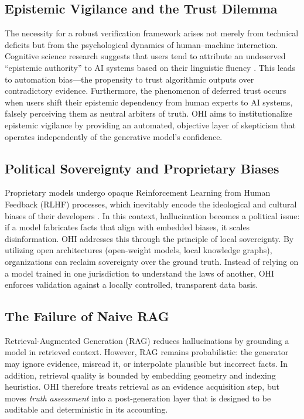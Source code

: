 \documentclass[10pt,a4paper,twocolumn]{article}
\begin{document}
\subsection{Epistemic Vigilance and the Trust Dilemma}
The necessity for a robust verification framework arises not merely from technical deficits but from the psychological dynamics of human--machine interaction. Cognitive science research suggests that users tend to attribute an undeserved \enquote{epistemic authority} to AI systems based on their linguistic fluency \cite{jaeger2024}. This leads to automation bias---the propensity to trust algorithmic outputs over contradictory evidence. Furthermore, the phenomenon of deferred trust occurs when users shift their epistemic dependency from human experts to AI systems, falsely perceiving them as neutral arbiters of truth. OHI aims to institutionalize epistemic vigilance by providing an automated, objective layer of skepticism that operates independently of the generative model's confidence.

\subsection{Political Sovereignty and Proprietary Biases}
Proprietary models undergo opaque Reinforcement Learning from Human Feedback (RLHF) processes, which inevitably encode the ideological and cultural biases of their developers \cite{motoki2024}. In this context, hallucination becomes a political issue: if a model fabricates facts that align with embedded biases, it scales disinformation. OHI addresses this through the principle of local sovereignty. By utilizing open architectures (open-weight models, local knowledge graphs), organizations can reclaim sovereignty over the ground truth. Instead of relying on a model trained in one jurisdiction to understand the laws of another, OHI enforces validation against a locally controlled, transparent data basis.

\subsection{The Failure of Naive RAG}
Retrieval-Augmented Generation (RAG) \cite{lewis2020rag} reduces hallucinations by grounding a model in retrieved context. However, RAG remains probabilistic: the generator may ignore evidence, misread it, or interpolate plausible but incorrect facts. In addition, retrieval quality is bounded by embedding geometry and indexing heuristics. OHI therefore treats retrieval as an evidence acquisition step, but moves \emph{truth assessment} into a post-generation layer that is designed to be auditable and deterministic in its accounting.
\end{document}
